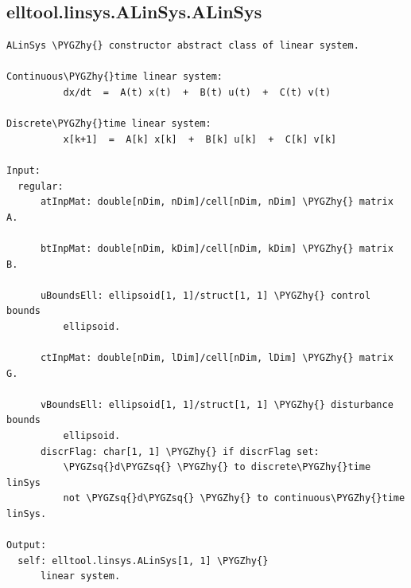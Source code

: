 \documentclass[letterpaper,10pt,english]{sphinxmanual}
\def\PYGZhy{\char`\-}
\def\PYGZsq{\char`\'}
\begin{document}
\subsection{elltool.linsys.ALinSys.ALinSys}
\label{chap_functions:elltool-linsys-alinsys-alinsys}
\begin{Verbatim}[commandchars=\\\{\}]
ALinSys \PYGZhy{} constructor abstract class of linear system.

Continuous\PYGZhy{}time linear system:
          dx/dt  =  A(t) x(t)  +  B(t) u(t)  +  C(t) v(t)

Discrete\PYGZhy{}time linear system:
          x[k+1]  =  A[k] x[k]  +  B[k] u[k]  +  C[k] v[k]

Input:
  regular:
      atInpMat: double[nDim, nDim]/cell[nDim, nDim] \PYGZhy{} matrix A.

      btInpMat: double[nDim, kDim]/cell[nDim, kDim] \PYGZhy{} matrix B.

      uBoundsEll: ellipsoid[1, 1]/struct[1, 1] \PYGZhy{} control bounds
          ellipsoid.

      ctInpMat: double[nDim, lDim]/cell[nDim, lDim] \PYGZhy{} matrix G.

      vBoundsEll: ellipsoid[1, 1]/struct[1, 1] \PYGZhy{} disturbance bounds
          ellipsoid.
      discrFlag: char[1, 1] \PYGZhy{} if discrFlag set:
          \PYGZsq{}d\PYGZsq{} \PYGZhy{} to discrete\PYGZhy{}time linSys
          not \PYGZsq{}d\PYGZsq{} \PYGZhy{} to continuous\PYGZhy{}time linSys.

Output:
  self: elltool.linsys.ALinSys[1, 1] \PYGZhy{}
      linear system.
\end{Verbatim}
\end{document}
